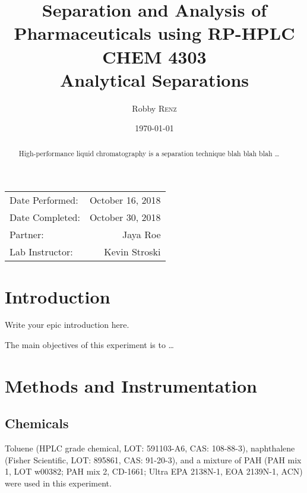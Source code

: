 \documentclass[a4paper, 12pt]{article}
\title{Separation and Analysis of Pharmaceuticals using RP-HPLC \\ CHEM 4303 \\ Analytical Separations} %
\author{Robby \textsc{Renz}} %
\date{\today} %
\begin{document}
\maketitle %

\begin{center}
\begin{tabular}{l r}
Date Performed: & October 16, 2018 \\ %
Date Completed: & October 30, 2018 \\
Partner: & Jaya Roe \\ %
Lab Instructor: & Kevin Stroski %
\end{tabular}
\end{center}


\begin{abstract}
	High-performance liquid chromatography is a separation technique blah blah blah \dots
\end{abstract}
\newpage


\section{Introduction}
Write your epic introduction here.

The main objectives of this experiment is to \ldots{}


\section{Methods and Instrumentation}

\subsection{Chemicals}
Toluene (HPLC grade chemical, LOT: 591103-A6, CAS: 108-88-3), naphthalene (Fisher Scientific, LOT: 895861, CAS: 91-20-3), and a mixture of PAH (PAH mix 1, LOT w00382; PAH mix 2, CD-1661; Ultra EPA 2138N-1, EOA 2139N-1, ACN) were used in this experiment.
\end{document}
